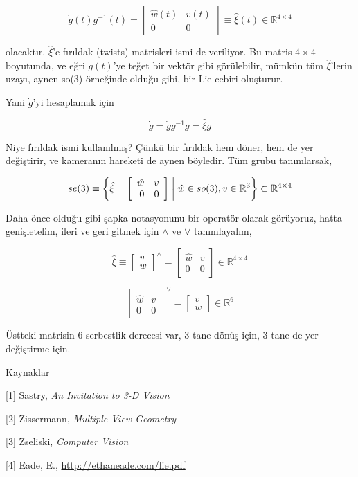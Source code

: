 \documentclass[12pt,fleqn]{article}\usepackage{../../common}
\begin{document}
$$ \dot{g}(t) g^{-1}(t) = 
\left[\begin{array}{rrr}
\hat{w}(t) & v(t) \\ 0 & 0
\end{array}\right] 
\equiv \hat{\xi}(t) 
\in \mathbb{R}^{4 \times 4}
$$

olacaktır. $\hat{\xi}$'e fırıldak (twists) matrisleri ismi de veriliyor. Bu matris 
$4 \times 4$  boyutunda, ve eğri $g(t)$'ye teğet bir vektör gibi görülebilir, mümkün 
tüm $\hat{\xi}$'lerin uzayı, aynen so(3) örneğinde olduğu gibi, bir Lie
cebiri  oluşturur. 

Yani $\dot{g}$'yi hesaplamak için 

$$ \dot{g} = \dot{g}g^{-1}g = \hat{\xi} g $$

Niye fırıldak ismi kullanılmış? Çünkü bir fırıldak hem döner, hem de yer
değiştirir, ve kameranın hareketi de aynen böyledir. Tüm grubu tanımlarsak, 

$$ 
se(3) \equiv \bigg\{
\hat{\xi} =
\left[\begin{array}{rrr}
\hat{w} & v \\ 0 & 0
\end{array}\right] 
\biggm\vert
\hat{w} \in so(3), v \in \mathbb{R}^3 
\bigg\}
\subset \mathbb{R}^{4 \times 4}
 $$

Daha önce olduğu gibi şapka notasyonunu bir operatör olarak görüyoruz,
hatta genişletelim, ileri ve geri gitmek için $\land$ ve $\lor$
tanımlayalım,

$$ \hat{\xi} 
\equiv
\left[\begin{array}{c}
v \\ w
\end{array}\right]^{\land} 
=
\left[\begin{array}{cc}
\hat{w} & v \\ 0 & 0
\end{array}\right]  \in \mathbb{R}^{4 \times 4}
 $$

$$ 
\left[\begin{array}{cc}
\hat{w} & v \\ 0 & 0
\end{array}\right]^{\lor} = 
\left[\begin{array}{c}
v \\ w
\end{array}\right] \in \mathbb{R}^6
 $$

Üstteki matrisin 6 serbestlik derecesi var, 3 tane dönüş için, 3 tane de
yer değiştirme için.

Kaynaklar 

[1] Sastry, {\em An Invitation to 3-D Vision}

[2] Zissermann, {\em Multiple View Geometry}

[3] Zseliski, {\em Computer Vision}

[4] Eade, E., \url{http://ethaneade.com/lie.pdf}
\end{document}
